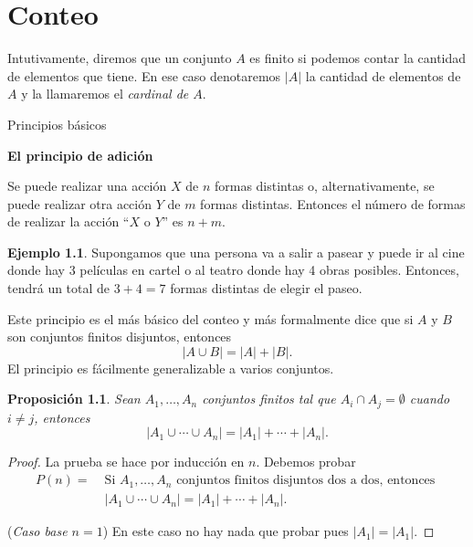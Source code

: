 \documentclass[11pt,spanish,makeidx]{amsbook}
\newtheorem{proposicion}[teorema]{Proposici\'on}
\theoremstyle{definition}
\newtheorem{ejemplo}{Ejemplo}[section]
\theoremstyle{remark}
\begin{document}
\chapter[Conteo]{Conteo}

Intutivamente, diremos que un conjunto $A$ es finito si podemos contar la cantidad de elementos que tiene. En ese caso denotaremos $|A|$ la cantidad de elementos de $A$ y la llamaremos el {\em cardinal de $A$}.  

\begin{section}{Principios básicos}

\noindent\textbf{El principio de adición}

Se puede realizar una acción $X$ de $n$ formas distintas o, alternativamente, se puede realizar otra acción $Y$ de $m$ formas distintas. Entonces el número de formas de realizar la acción ``$X$ o $Y$'' es $n + m$.

\begin{ejemplo}\label{cine} Supongamos que una persona va a salir a pasear  y puede ir al cine donde hay 3 películas en cartel o al teatro donde hay 4 obras posibles. Entonces, tendrá un total de $3+4=7$ formas distintas de elegir el paseo. 
\end{ejemplo}

Este principio es el más básico del conteo y más formalmente dice que si $A$ y $B$ son conjuntos finitos disjuntos, entonces 
\begin{equation}\label{padd}
|A \cup B| =|A|+|B|.
\end{equation}
El principio es fácilmente generalizable a varios conjuntos.

\begin{proposicion}\label{principiodeadicion}
Sean $A_1,\ldots,A_n$ conjuntos finitos tal que $A_i \cap A_j = \emptyset$ cuando $i\not=j$, entonces 
\begin{equation*}
|A_1 \cup \cdots \cup A_n| =|A_1|+\cdots+|A_n|.
\end{equation*}
\end{proposicion}
\begin{proof} 
La  prueba se hace por inducción en $n$. Debemos probar 
\begin{align*}
P(n) =\; &\text{Si $A_1,\ldots,A_n$ conjuntos finitos disjuntos dos a dos, entonces }\\  &|A_1 \cup \cdots \cup A_n| =|A_1|+\cdots+|A_n|.
\end{align*}

({\em Caso base $n=1$}) En este caso no hay nada que probar pues  $|A_1|=|A_1|$.


\end{proof}
\end{section}
\end{document}
